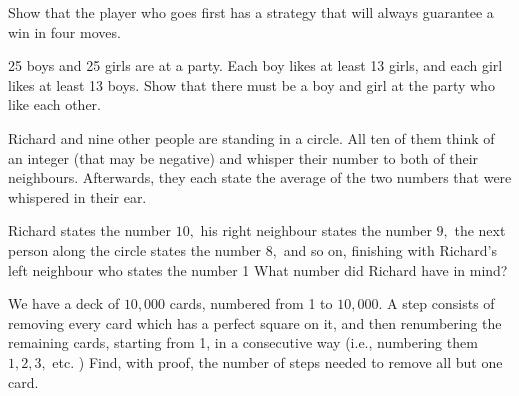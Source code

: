\documentclass{pset}
\begin{document}
\begin{problems}
\begin{problem}
\begin{center}
    \end{center}
    Show that the player who goes first has a strategy that will always guarantee a win in four moves.
\end{problem}

\begin{problem}
    25 boys and 25 girls are at a party. Each boy likes at least 13 girls, and each girl likes at least 13 boys.
    Show that there must be a boy and girl at the party who like each other.
\end{problem}

\begin{problem}
    Richard and nine other people are standing in a circle. All ten of them think of an integer (that may be negative) and whisper their number to both of their neighbours. Afterwards, they each state the average of the two numbers that were whispered in their ear.

    Richard states the number \(10,\) his right neighbour states the number \(9,\) the next person along the circle states the number \(8,\) and so on, finishing with Richard's left neighbour who states the number 1
    What number did Richard have in mind?
\end{problem}

\begin{problem}
    We have a deck of \(10,000\) cards, numbered from 1 to \(10,000 .\) A step consists of removing every card which has a perfect square on it, and then renumbering the remaining cards, starting from 1, in a consecutive way (i.e., numbering them \(1,2,3,\) etc. ) Find, with proof, the number of steps needed to remove all but one card.
\end{problem}


\end{problems}
\end{document}
